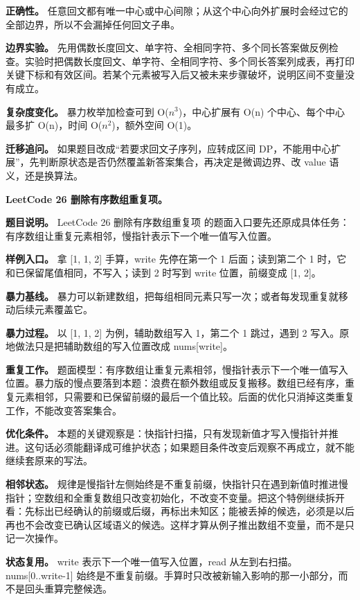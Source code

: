\textbf{正确性。} 任意回文都有唯一中心或中心间隙；从这个中心向外扩展时会经过它的全部边界，所以不会漏掉任何回文子串。

\textbf{边界实验。} 先用偶数长度回文、单字符、全相同字符、多个同长答案做反例检查。实验时把偶数长度回文、单字符、全相同字符、多个同长答案列成表，再打印关键下标和有效区间。若某个元素被写入后又被未来步骤破坏，说明区间不变量没有成立。

\textbf{复杂度变化。} 暴力枚举加检查可到 O(\ensuremath{n^{3}})，中心扩展有 O(n) 个中心、每个中心最多扩 O(n)，时间 O(\ensuremath{n^{2}})，额外空间 O(1)。

\textbf{迁移追问。} 如果题目改成“若要求回文子序列，应转成区间 DP，不能用中心扩展”，先判断原状态是否仍然覆盖新答案集合，再决定是微调边界、改 value 语义，还是换算法。

\noindent\textbf{LeetCode 26 删除有序数组重复项。}

\textbf{题目说明。} LeetCode 26 删除有序数组重复项 的题面入口要先还原成具体任务：有序数组让重复元素相邻，慢指针表示下一个唯一值写入位置。

\textbf{样例入口。} 拿 [1, 1, 2] 手算，write 先停在第一个 1 后面；读到第二个 1 时，它和已保留尾值相同，不写入；读到 2 时写到 write 位置，前缀变成 [1, 2]。

\textbf{暴力基线。} 暴力可以新建数组，把每组相同元素只写一次；或者每发现重复就移动后续元素覆盖它。

\textbf{暴力过程。} 以 [1, 1, 2] 为例，辅助数组写入 1，第二个 1 跳过，遇到 2 写入。原地做法只是把辅助数组的写入位置改成 nums[write]。

\textbf{重复工作。} 题面模型：有序数组让重复元素相邻，慢指针表示下一个唯一值写入位置。暴力版的慢点要落到本题：浪费在额外数组或反复搬移。数组已经有序，重复元素相邻，只需要和已保留前缀的最后一个值比较。后面的优化只消掉这类重复工作，不能改变答案集合。

\textbf{优化条件。} 本题的关键观察是：快指针扫描，只有发现新值才写入慢指针并推进。这句话必须能翻译成可维护状态；如果题目条件改变后观察不再成立，就不能继续套原来的写法。

\textbf{相邻状态。} 规律是慢指针左侧始终是不重复前缀，快指针只在遇到新值时推进慢指针；空数组和全重复数组只改变初始化，不改变不变量。把这个特例继续拆开看：先标出已经确认的前缀或后缀，再标出未知区；能被丢掉的候选，必须是以后再也不会改变已确认区域语义的候选。这样才算从例子推出数组不变量，而不是只记一次操作。

\textbf{状态复用。} write 表示下一个唯一值写入位置，read 从左到右扫描。nums[0..write-1] 始终是不重复前缀。手算时只改被新输入影响的那一小部分，而不是回头重算完整候选。

